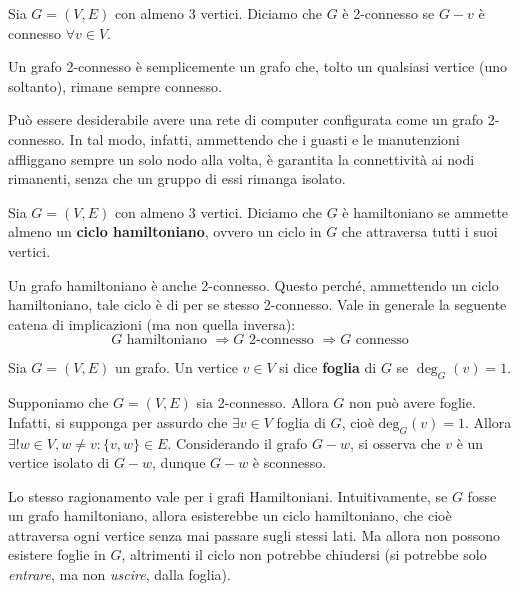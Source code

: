 \begin{tcolorbox}[colback=yellow!30, colframe=yellow!30!black, title=Grafo 2-connesso]
Sia $G=(V,E)$ con almeno 3 vertici. Diciamo che $G$ è 2-connesso se $G-v$ è
connesso $\forall v \in V$.
\end{tcolorbox}

Un grafo 2-connesso è semplicemente un grafo che, tolto un
qualsiasi vertice (uno soltanto), rimane sempre connesso.

Può essere desiderabile avere una rete di computer configurata
come un grafo 2-connesso. In tal modo, infatti, ammettendo che
i guasti e le manutenzioni affliggano sempre un solo nodo alla
volta, è garantita la connettività ai nodi rimanenti, senza che
un gruppo di essi rimanga isolato.

\begin{tcolorbox}[colback=yellow!30, colframe=yellow!30!black, title=Grafo Hamiltoniano]
Sia $G=(V,E)$ con almeno 3 vertici. Diciamo che $G$ è hamiltoniano se ammette
almeno un \textbf{ciclo hamiltoniano}, ovvero un ciclo in $G$ che attraversa
tutti i suoi vertici.
\end{tcolorbox}
\noindent Un grafo hamiltoniano è anche 2-connesso. Questo perché,
ammettendo un ciclo hamiltoniano, tale ciclo è di per se stesso
2-connesso.
Vale in generale la seguente catena di implicazioni (ma non quella inversa):
\[ G \text{ hamiltoniano } \Longrightarrow G \text{ 2-connesso } \Longrightarrow G \text{ connesso} \]
\begin{tcolorbox}[colback=yellow!30, colframe=yellow!30!black, title=Foglia]
Sia $G=(V,E)$ un grafo. Un vertice $v\in V$ si dice \textbf{foglia} di $G$
se $\deg_G(v)=1$.
\end{tcolorbox}
\noindent Supponiamo che $G=(V,E)$ sia 2-connesso. Allora $G$ non
può avere foglie. Infatti, si supponga per assurdo che $\exists v\in V$
foglia di $G$, cioè $\text{deg}_G(v)=1$. Allora $\exists!w\in V,w\not=v:\{v,w\}\in E$.
Considerando il grafo $G-w$, si osserva che $v$ è un vertice isolato di
$G-w$, dunque $G-w$ è sconnesso.
\begin{osservaz}
Lo stesso ragionamento vale per i grafi Hamiltoniani. Intuitivamente,
se $G$ fosse un grafo hamiltoniano, allora esisterebbe un ciclo hamiltoniano,
che cioè attraversa ogni vertice senza mai passare sugli stessi lati.
Ma allora non possono esistere foglie in $G$, altrimenti il ciclo
non potrebbe chiudersi (si potrebbe solo \emph{entrare}, ma non \emph{uscire}, dalla
foglia).
\end{osservaz}

